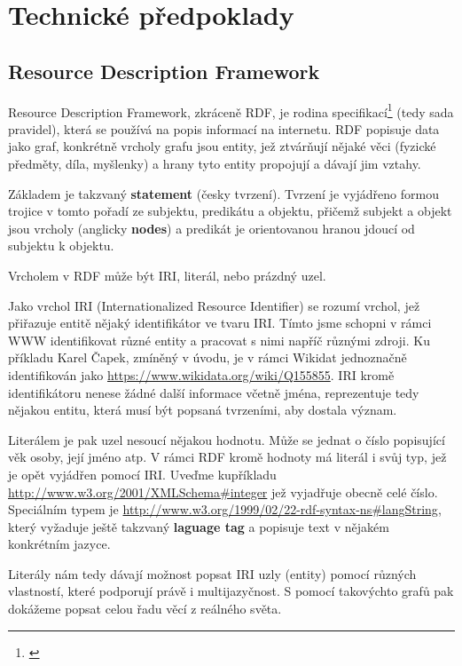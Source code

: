 \chapter{Technické předpoklady}

\section{Resource Description Framework}
Resource Description Framework, zkráceně RDF, je rodina specifikací\footnote{\citet{Raimond:14:RP}} (tedy sada pravidel), která se používá na popis informací na internetu. RDF popisuje data jako graf, konkrétně vrcholy grafu jsou entity, jež ztvárňují nějaké věci (fyzické předměty, díla, myšlenky) a hrany tyto entity propojují a dávají jim vztahy.

Základem je takzvaný \textbf{statement} (česky tvrzení). Tvrzení je vyjádřeno formou trojice v tomto pořadí ze subjektu, predikátu a objektu, přičemž subjekt a objekt jsou vrcholy (anglicky \textbf{nodes}) a predikát je orientovanou hranou jdoucí od subjektu k objektu.

Vrcholem v RDF může být IRI, literál, nebo prázdný uzel.

\medskip

Jako vrchol IRI (Internationalized Resource Identifier) se rozumí vrchol, jež přiřazuje entitě nějaký identifikátor ve tvaru IRI. Tímto jsme schopni v rámci WWW identifikovat různé entity a pracovat s nimi napříč různými zdroji. Ku příkladu Karel Čapek, zmíněný v úvodu, je v rámci Wikidat jednoznačně identifikován jako \url{https://www.wikidata.org/wiki/Q155855}. IRI kromě identifikátoru nenese žádné další informace včetně jména, reprezentuje tedy nějakou entitu, která musí být popsaná tvrzeními, aby dostala význam.

\medskip

Literálem je pak uzel nesoucí nějakou hodnotu. Může se jednat o číslo popisující věk osoby, její jméno atp. V rámci RDF kromě hodnoty má literál i svůj typ, jež je opět vyjádřen pomocí IRI. Uveďme kupříkladu \url{http://www.w3.org/2001/XMLSchema#integer} jež vyjadřuje obecně celé číslo. Speciálním typem je \url{http://www.w3.org/1999/02/22-rdf-syntax-ns#langString}, který vyžaduje ještě takzvaný \textbf{laguage tag} a popisuje text v nějakém konkrétním jazyce.

\medskip

Literály nám tedy dávají možnost popsat IRI uzly (entity) pomocí různých vlastností, které podporují právě i multijazyčnost. S pomocí takovýchto grafů pak dokážeme popsat celou řadu věcí z reálného světa.

